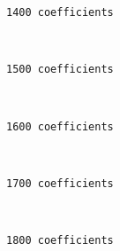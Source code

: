     \begin{Verbatim}[commandchars=\\\{\}]
1400 coefficients
    \end{Verbatim}

    \begin{center}
    \end{center}
    { \hspace*{\fill} \\}
    
    \begin{Verbatim}[commandchars=\\\{\}]
1500 coefficients
    \end{Verbatim}

    \begin{center}
    \end{center}
    { \hspace*{\fill} \\}
    
    \begin{Verbatim}[commandchars=\\\{\}]
1600 coefficients
    \end{Verbatim}

    \begin{center}
    \end{center}
    { \hspace*{\fill} \\}
    
    \begin{Verbatim}[commandchars=\\\{\}]
1700 coefficients
    \end{Verbatim}

    \begin{center}
    \end{center}
    { \hspace*{\fill} \\}
    
    \begin{Verbatim}[commandchars=\\\{\}]
1800 coefficients
    \end{Verbatim}

    \begin{center}
    \end{center}
    { \hspace*{\fill} \\}
    
